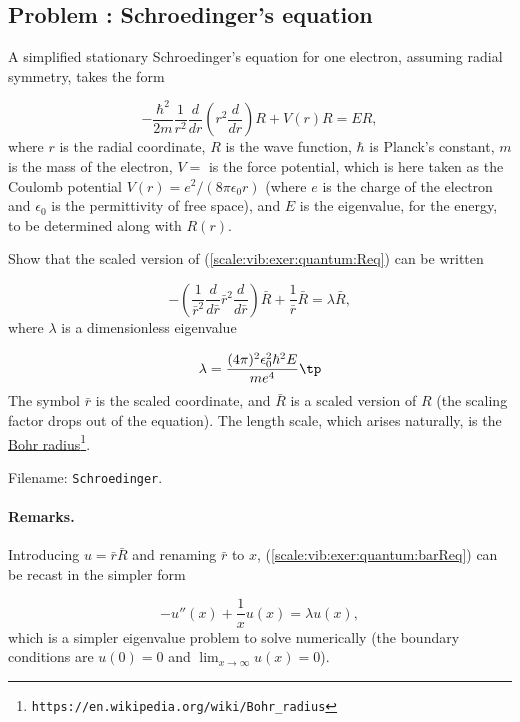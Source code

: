 \documentclass[graybox,envcountchap,sectrefs,final]{svmonodo}
\newcounter{doconce:movie:counter}
\newenvironment{doconceexercise}{}{}
\newcounter{doconceexercisecounter}
\begin{document}
\begin{doconceexercise}

\subsection*{Problem \thedoconceexercisecounter: Schroedinger's equation}

\label{scale:vib:exer:quantum}

A simplified stationary
Schroedinger's equation for one electron, assuming radial symmetry, takes
the form

\begin{equation}
-\frac{\hbar^2}{2m}
\frac{1}{r^2}\frac{d}{dr}\left(r^2\frac{d}{dr}\right) R
+ V(r)R = ER,
\label{scale:vib:exer:quantum:Req}
\end{equation}
where $r$ is the radial coordinate, $R$ is the wave function,
$\hbar$ is Planck's constant, $m$ is the mass of the electron,
$V=$ is the force potential, which is here taken as the
Coulomb potential $V(r) = {e^2}/(8\pi\epsilon_0 r)$
(where $e$ is the charge of the electron and $\epsilon_0$ is the
permittivity of free space), and $E$ is
the eigenvalue, for the energy, to be determined along with $R(r)$.

Show that the scaled version of (\ref{scale:vib:exer:quantum:Req}) can be written

\begin{equation}
- \left(\frac{1}{\bar r^2}\frac{d}{d\bar r}\bar r^2
\frac{d}{d\bar r}\right)
\bar R + \frac{1}{\bar r}\bar R = \lambda\bar R,
\label{scale:vib:exer:quantum:barReq}
\end{equation}
where $\lambda$ is a dimensionless eigenvalue

\[ \lambda = \frac{(4\pi)^2\epsilon_0^2\hbar^2E}{me^4}\tp\]
The symbol $\bar r$ is the scaled coordinate, and $\bar R$ is a scaled
version of $R$ (the scaling factor drops out of the equation).
The length scale, which arises naturally, is the
\href{{https://en.wikipedia.org/wiki/Bohr_radius}}{Bohr radius}\footnote{\texttt{https://en.wikipedia.org/wiki/Bohr\_radius}}.


\noindent Filename: \texttt{Schroedinger}.


\paragraph{Remarks.}
Introducing $u=\bar r\bar R$ and renaming $\bar r$ to $x$,
(\ref{scale:vib:exer:quantum:barReq}) can be recast in the simpler form

\[ -u''(x) + \frac{1}{x}u(x) = \lambda u(x),\]
which is a simpler eigenvalue problem to solve numerically (the boundary
conditions are $u(0)=0$ and $\lim_{x\rightarrow\infty}u(x)=0$).


\end{doconceexercise}
\end{document}
